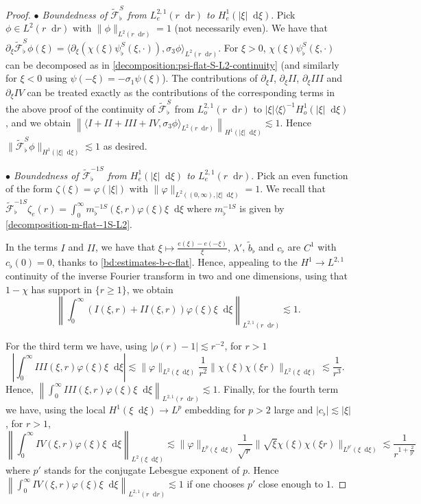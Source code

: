 \documentclass[11 pt]{amsart}
\theoremstyle{definition}
\theoremstyle{remark}
\numberwithin{equation}{section}
\newcommand{\dd}{\mathop{}\!\mathrm{d}}
\begin{document}
\begin{proof}
\smallskip

\noindent \textit{$\bullet$ Boundedness of $\widetilde{\mathcal F}_\flat^S$ from $L^{2,1}_{e}(r\dd r)$ to $H^{1}_{e}(|\xi|\dd \xi)$}. Pick $\phi \in L^2(r\dd r)$ with $\| \phi\|_{L^2(r\dd r)}= 1$ (not necessarily even). We have that $\partial_\xi \widetilde{\mathcal F}_\flat^S\phi(\xi)=\langle \partial_\xi(\chi(\xi)\psi^S_\flat(\xi,\cdot)),\sigma_3 \phi\rangle_{L^2(r\dd r)}$. For $\xi>0$, $\chi(\xi) \psi^S_\flat(\xi,\cdot)$ can be decomposed as in \eqref{decomposition:psi-flat-S-L2-continuity} (and similarly for $\xi<0$ using $\psi(-\xi)=-\sigma_1 \psi(\xi)$). The contributions of $\partial_\xi I$, $\partial_\xi II$, $\partial_\xi III$ and $\partial_\xi IV$ can be treated exactly as the contributions of the corresponding terms in the above proof of the continuity of $\widetilde{\mathcal F}_\flat^S$ from $L^{2,1}_{o}(r\dd r)$ to $|\xi| \langle \xi\rangle^{-1}H^{1}_{o}(|\xi|\dd \xi)$, and we obtain $\left\| \langle I+II+III+IV ,\sigma_3 \phi\rangle_{L^2(r\dd r)} \right\|_{H^1(|\xi| \dd \xi)} \lesssim 1$. Hence $\| \widetilde{\mathcal F}_\flat^S\phi \|_{H^1(|\xi|\dd \xi)}\lesssim 1$ as desired.

\smallskip

\noindent \textit{$\bullet$ Boundedness of $\widetilde{\mathcal F}_\flat^{-1S}$ from $ H^1_{e}(|\xi|\dd \xi)$ to $L^{2,1}_{e}(r\dd r)$}. Pick an even function of the form $\zeta(\xi) =\varphi(|\xi|) $ with $\| \varphi\|_{L^2((0,\infty),|\xi|\dd \xi)}= 1$. We recall that $\widetilde {\mathcal F}_\flat ^{-1S} \zeta_e (r) = \int_0^\infty m^{-1S}_{\flat}(\xi,r) \varphi(\xi)\xi \dd \xi$ where $m_\flat^{-1S}$ is given by \eqref{decomposition-m-flat--1S-L2}.

In the terms $I$ and $II$, we have that $\xi \mapsto \frac{e(\xi)-e(-\xi)}{\xi}$, $\lambda'$, $\widetilde b_\flat$ and $c_\flat $ are $C^1$ with $c_\flat(0)=0$, thanks to \eqref{bd:estimates-b-c-flat}. Hence, appealing to the $H^1\to L^{2,1}$ continuity of the inverse Fourier transform in two and one dimensions, using that $1-\chi$ has support in $\{ r\geq 1\}$, we obtain 
$$\left\| \int_0^\infty (I(\xi,r)+II(\xi,r))  \varphi(\xi)\xi \dd \xi  \right\|_{L^{2,1}(r\dd r)} \lesssim 1.
$$

For the third term we have, using $|\rho(r)-1|\lesssim r^{-2}$, for $r>1$
$$
\left|  \int_0^\infty III(\xi,r) \varphi(\xi)\xi \dd \xi \right| \lesssim \| \varphi \|_{L^2(\xi \dd \xi)}\frac{1}{r^2} \| \chi(\xi) \chi(\xi r)\|_{L^2(\xi \dd \xi)} \lesssim \frac{1}{r^3}.
$$
Hence, $\left\| \int_0^\infty III(\xi,r)  \varphi(\xi)\xi \dd \xi  \right\|_{L^{2,1}(r\dd r)} \lesssim 1$. Finally, for the fourth term we have, using the local $H^1(\xi \dd \xi)\to L^p$ embedding for $p>2$ large and $|c_\flat|\lesssim |\xi|$, for $r>1$,
$$
\left\|  \int_0^\infty IV(\xi,r) \varphi(\xi)\xi \dd \xi \right\|_{L^2(\xi \dd \xi)}\lesssim \| \varphi \|_{L^p(\xi \dd \xi)}\frac{1}{\sqrt{r}} \| \sqrt{\xi}\chi(\xi) \chi(\xi r)\|_{L^{p'}(\xi \dd \xi)} \lesssim \frac{1}{r^{1+\frac{2}{p'}}}
$$
where $p'$ stands for the conjugate Lebesgue exponent of $p$. Hence $\left\| \int_0^\infty IV(\xi,r)  \varphi(\xi)\xi \dd \xi  \right\|_{L^{2,1}(r\dd r)} \lesssim 1$ if one chooses $p'$ close enough to $1$.


\end{proof}
\end{document}
